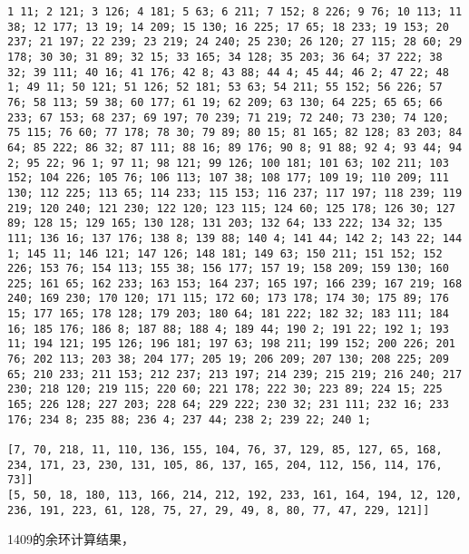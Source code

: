 \documentclass{article}
\begin{document}
\begin{verbatim}
1 11; 2 121; 3 126; 4 181; 5 63; 6 211; 7 152; 8 226; 9 76; 10 113; 11 38; 12 177; 13 19; 14 209; 15 130; 16 225; 17 65; 18 233; 19 153; 20 237; 21 197; 22 239; 23 219; 24 240; 25 230; 26 120; 27 115; 28 60; 29 178; 30 30; 31 89; 32 15; 33 165; 34 128; 35 203; 36 64; 37 222; 38 32; 39 111; 40 16; 41 176; 42 8; 43 88; 44 4; 45 44; 46 2; 47 22; 48 1; 49 11; 50 121; 51 126; 52 181; 53 63; 54 211; 55 152; 56 226; 57 76; 58 113; 59 38; 60 177; 61 19; 62 209; 63 130; 64 225; 65 65; 66 233; 67 153; 68 237; 69 197; 70 239; 71 219; 72 240; 73 230; 74 120; 75 115; 76 60; 77 178; 78 30; 79 89; 80 15; 81 165; 82 128; 83 203; 84 64; 85 222; 86 32; 87 111; 88 16; 89 176; 90 8; 91 88; 92 4; 93 44; 94 2; 95 22; 96 1; 97 11; 98 121; 99 126; 100 181; 101 63; 102 211; 103 152; 104 226; 105 76; 106 113; 107 38; 108 177; 109 19; 110 209; 111 130; 112 225; 113 65; 114 233; 115 153; 116 237; 117 197; 118 239; 119 219; 120 240; 121 230; 122 120; 123 115; 124 60; 125 178; 126 30; 127 89; 128 15; 129 165; 130 128; 131 203; 132 64; 133 222; 134 32; 135 111; 136 16; 137 176; 138 8; 139 88; 140 4; 141 44; 142 2; 143 22; 144 1; 145 11; 146 121; 147 126; 148 181; 149 63; 150 211; 151 152; 152 226; 153 76; 154 113; 155 38; 156 177; 157 19; 158 209; 159 130; 160 225; 161 65; 162 233; 163 153; 164 237; 165 197; 166 239; 167 219; 168 240; 169 230; 170 120; 171 115; 172 60; 173 178; 174 30; 175 89; 176 15; 177 165; 178 128; 179 203; 180 64; 181 222; 182 32; 183 111; 184 16; 185 176; 186 8; 187 88; 188 4; 189 44; 190 2; 191 22; 192 1; 193 11; 194 121; 195 126; 196 181; 197 63; 198 211; 199 152; 200 226; 201 76; 202 113; 203 38; 204 177; 205 19; 206 209; 207 130; 208 225; 209 65; 210 233; 211 153; 212 237; 213 197; 214 239; 215 219; 216 240; 217 230; 218 120; 219 115; 220 60; 221 178; 222 30; 223 89; 224 15; 225 165; 226 128; 227 203; 228 64; 229 222; 230 32; 231 111; 232 16; 233 176; 234 8; 235 88; 236 4; 237 44; 238 2; 239 22; 240 1; 

[7, 70, 218, 11, 110, 136, 155, 104, 76, 37, 129, 85, 127, 65, 168, 234, 171, 23, 230, 131, 105, 86, 137, 165, 204, 112, 156, 114, 176, 73]]
[5, 50, 18, 180, 113, 166, 214, 212, 192, 233, 161, 164, 194, 12, 120, 236, 191, 223, 61, 128, 75, 27, 29, 49, 8, 80, 77, 47, 229, 121]]

\end{verbatim}
1409的余环计算结果，
\end{document}

